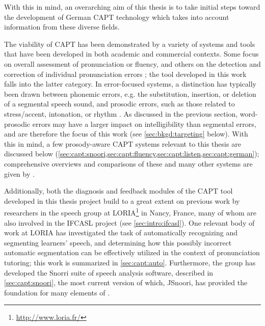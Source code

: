 With this in mind, an overarching aim of this thesis is to take initial steps toward the development of German CAPT technology which takes into account information from these diverse fields. 
%
%	
%
%
%	
%	
	\label{sec:capt:systems}
		
	The viability of CAPT has been demonstrated by a variety of systems and tools that have been developed in both academic and commercial contexts. Some focus on overall assessment of pronunciation or fluency, and others on the detection and correction of individual pronunciation errors \citep{Eskenazi2009}; the tool developed in this work falls into the latter category. In error-focused systems, a distinction has typically been drawn between phonemic errors, e.g. the substitution, insertion, or deletion of a segmental speech sound, and prosodic errors, such as those related to stress/accent, intonation, or rhythm \citep{Witt2012}. As discussed in the previous section, word-prosodic errors may have a larger impact on intelligibility than segmental errors, and are therefore the focus of this work (see \cref{sec:bkgd:targeting} below). 
	With this in mind, a few prosody-aware CAPT systems relevant to this thesis are discussed below (\cref{sec:capt:snoori,sec:capt:fluency,sec:capt:listen,sec:capt:german}); comprehensive overviews and comparisons of these and many other systems are given by \textcite{Neri2002,Eskenazi2009,Delmonte2011,Witt2012}.  
	
	
		Additionally,
		both the diagnosis and feedback modules of the  CAPT tool developed in this thesis project build to a great extent on previous work by researchers in the speech group at LORIA\footnote{\url{http://www.loria.fr/}} in Nancy, France, many of whom are also involved in the IFCASL project (see \cref{sec:intro:ifcasl}). 
		One relevant body of work at LORIA has investigated the task of automatically recognizing and segmenting learners' speech, and determining how this possibly incorrect automatic segmentation can be effectively utilized in the context of pronunciation tutoring; this work is summarized in \cref{sec:capt:auto}. Furthermore, the group has developed the Snorri suite of speech analysis software, described in \cref{sec:capt:snoori}, the most current version of which, JSnoori, has provided the foundation for many elements of .
		
